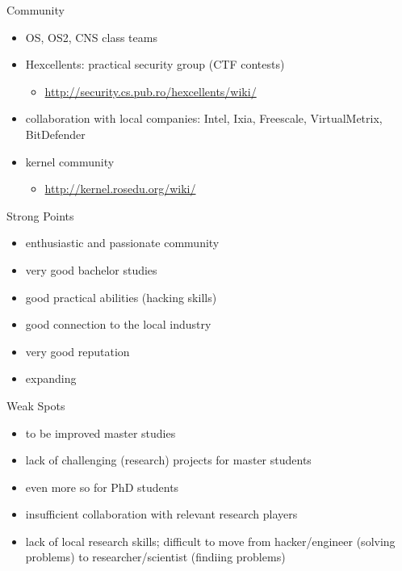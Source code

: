 \documentclass{beamer}
\begin{document}
\begin{frame}{Community}
  \begin{itemize}
    \pause \item OS, OS2, CNS class teams
    \pause \item Hexcellents: practical security group (CTF contests)
      \begin{itemize}
        \item \url{http://security.cs.pub.ro/hexcellents/wiki/}
      \end{itemize}
    \pause \item collaboration with local companies: Intel, Ixia, Freescale,
      VirtualMetrix, BitDefender
    \pause \item kernel community
      \begin{itemize}
        \item \url{http://kernel.rosedu.org/wiki/}
      \end{itemize}
  \end{itemize}
\end{frame}

\begin{frame}{Strong Points}
  \begin{itemize}
    \pause \item enthusiastic and passionate community
    \pause \item very good bachelor studies
    \pause \item good practical abilities (hacking skills)
    \pause \item good connection to the local industry
    \pause \item very good reputation
    \pause \item expanding
  \end{itemize}
\end{frame}

\begin{frame}{Weak Spots}
  \begin{itemize}
    \pause \item to be improved master studies
    \pause \item lack of challenging (research) projects for master students
    \pause \item even more so for PhD students
    \pause \item insufficient collaboration with relevant research players
    \pause \item lack of local research skills; difficult to move from
      hacker/engineer (solving problems) to researcher/scientist (findiing
      problems)
  \end{itemize}
\end{frame}
\end{document}
